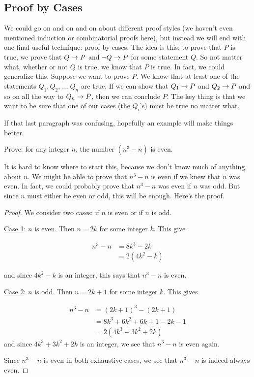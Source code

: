 \documentclass[12pt]{article}
\begin{document}
 
 
\subsection*{Proof by Cases}

We could go on and on and on about different proof styles (we haven't even mentioned induction or combinatorial proofs here), but instead we will end with one final useful technique: proof by cases.  The idea is this: to prove that $P$ is true, we prove that $Q \rightarrow P$ and $\neg Q \rightarrow P$ for some statement $Q$.  So not matter what, whether or not $Q$ is true, we know that $P$ is true.  In fact, we could generalize this.  Suppose we want to prove $P$.  We know that at least one of the statements $Q_1, Q_2, \ldots, Q_n$ are true.  If we can show that $Q_1 \rightarrow P$ and $Q_2 \rightarrow P$ and so on all the way to $Q_n \rightarrow P$, then we can conclude $P$.  The key thing is that we want to be sure that one of our cases (the $Q_i$'s) must be true no matter what.

If that last paragraph was confusing, hopefully an example will make things better.

\begin{example}
Prove: for any integer $n$, the number $(n^3 -n)$ is even.

\begin{solution}
It is hard to know where to start this, because we don't know much of anything about $n$.  We might be able to prove that $n^3 - n$ is even if we knew that $n$ was even.  In fact, we could probably prove that $n^3-n$ was even if $n$ was odd.  But since $n$ must either be even or odd, this will be enough.  Here's the proof.

\begin{proof}
We consider two cases: if $n$ is even or if $n$ is odd.

\underline{Case 1}: $n$ is even.  Then $n = 2k$ for some integer $k$.  This give 

\begin{align*}
n^3 - n & = 8k^3 - 2k \\
& = 2(4k^2 - k)
\end{align*}

 and since $4k^2 - k$ is an integer, this says that $n^3-n$ is even.
 
 \underline{Case 2}: $n$ is odd.  Then $n = 2k+1$ for some integer $k$.  This gives
 
 \begin{align*}
 n^3 - n & = (2k+1)^3 - (2k+1) \\
 & = 8k^3 + 6k^2 + 6k + 1 - 2k - 1 \\
 & = 2(4k^3 + 3k^2 + 2k)
 \end{align*}
  and since $4k^3 + 3k^2 + 2k$ is an integer, we see that $n^3 - n$ is even again.
  
  Since $n^3 - n$ is even in both exhaustive cases, we see that $n^3 - n$ is indeed always even.
\end{proof}
\end{solution}


\end{example}
\end{document}
